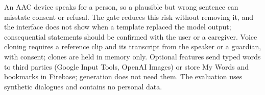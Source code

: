 An AAC device speaks for a person, so a plausible but wrong sentence can misstate consent or refusal. The gate reduces this risk without removing it, and the interface does not show when a template replaced the model output; consequential statements should be confirmed with the user or a caregiver.
Voice cloning requires a reference clip and its transcript from the speaker or a guardian, with consent; clones are held in memory only.
Optional features send typed words to third parties (Google Input Tools, OpenAI Images) or store My Words and bookmarks in Firebase; generation does not need them.
The evaluation uses synthetic dialogues and contains no personal data.
